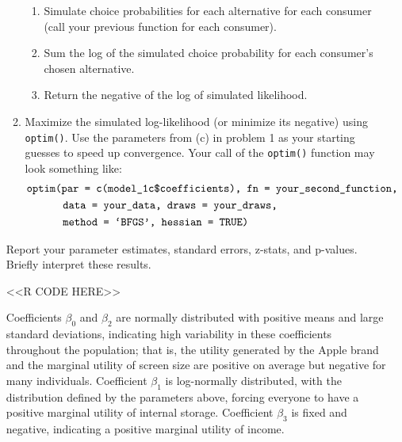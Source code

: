 \documentclass[11pt,letterpaper]{article}
\begin{document}
\begin{enumerate}[label=\alph*., leftmargin=*]
\begin{enumerate}[label=\Roman*.]
\begin{enumerate}[label=\roman*.]
			\item Simulate choice probabilities for each alternative for each consumer (call your previous function for each consumer).
			\item Sum the log of the simulated choice probability for each consumer's chosen alternative.
			\item Return the negative of the log of simulated likelihood.
		\end{enumerate}
		\item Maximize the simulated log-likelihood (or minimize its negative) using \texttt{optim()}. Use the parameters from (c) in problem 1 as your starting guesses to speed up convergence. Your call of the \texttt{optim()} function may look something like:
		\begin{align*}
			&\text{\texttt{optim(par = c(model\_1c\$coefficients), fn = your\_second\_function,}} \\
			& \qquad \quad \; \text{\texttt{data = your\_data, draws = your\_draws,}} \\
			& \qquad \quad \; \text{\texttt{method = `BFGS', hessian = TRUE)}}
		\end{align*}
	\end{enumerate}
	Report your parameter estimates, standard errors, z-stats, and p-values. Briefly interpret these results.

	<<R CODE HERE>>

	Coefficients $\beta_0$ and $\beta_2$ are normally distributed with positive means and large standard deviations, indicating high variability in these coefficients throughout the population; that is, the utility generated by the Apple brand and the marginal utility of screen size are positive on average but negative for many individuals. Coefficient $\beta_1$ is log-normally distributed, with the distribution defined by the parameters above, forcing everyone to have a positive marginal utility of internal storage. Coefficient $\beta_3$ is fixed and negative, indicating a positive marginal utility of income.


\end{enumerate}
\end{document}
